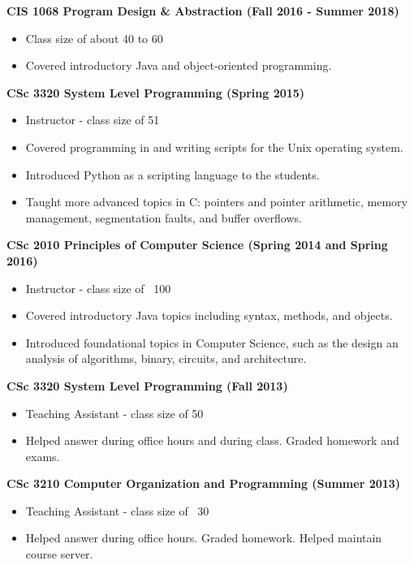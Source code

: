 \documentclass{res}
\begin{document}
\begin{resume}
\textbf{CIS 1068 Program Design \& Abstraction (Fall 2016 -  Summer 2018)}
\begin{itemize}
	\item Class size of about 40 to 60
	\item Covered introductory Java and object-oriented programming.
\end{itemize}




{\bf CSc 3320  System Level Programming (Spring 2015) }
\begin{itemize}
	\item Instructor - class size of 51
	\item Covered programming in and writing scripts for the Unix operating system.
	\item Introduced Python as a scripting language to the students.
	\item Taught more advanced topics in C: pointers and pointer arithmetic, memory management, segmentation faults, and buffer overflows.
\end{itemize}


{\bf CSc 2010 Principles of Computer Science (Spring 2014 and Spring 2016) }
\begin{itemize}
	\item Instructor - class size of ~100
	\item Covered introductory Java topics including syntax, methods, and objects.
	\item Introduced foundational topics in Computer Science, such as the design an analysis of algorithms, binary, circuits, and architecture.
\end{itemize}


{\bf CSc 3320  System Level Programming (Fall 2013)}
    \begin{itemize}
    \item Teaching Assistant - class size of 50
      \item Helped answer during office hours and during class.  Graded homework and exams.  
    \end{itemize}


{\bf CSc 3210 Computer Organization and Programming (Summer 2013)}
    \begin{itemize}
    \item Teaching Assistant - class size of ~30
      \item Helped answer during office hours.  Graded homework.  Helped maintain course server.
    \end{itemize}




\end{resume}
\end{document}

